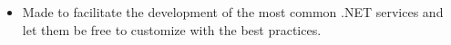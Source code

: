 
\begin{itemize}
    \item Made to facilitate the development of the most common .NET services and let them be free to customize with the best practices.
\end{itemize}
